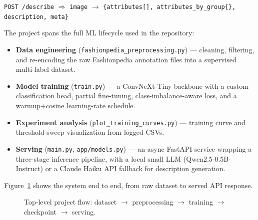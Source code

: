 \documentclass[11pt]{article}
\newcommand{\code}[1]{\texttt{\small #1}}
\begin{document}
\begin{center}
\texttt{POST /describe} \quad $\Longrightarrow$ \quad \texttt{image} $\to$ \texttt{\{attributes[], attributes\_by\_group\{\}, description, meta\}}
\end{center}

The project spans the full ML lifecycle used in the repository:

\begin{itemize}
\item \textbf{Data engineering} (\code{fashionpedia\_preprocessing.py}) --- cleaning, filtering, and re-encoding the raw Fashionpedia annotation files into a supervised multi-label dataset.
\item \textbf{Model training} (\code{train.py}) --- a ConvNeXt-Tiny backbone with a custom classification head, partial fine-tuning, class-imbalance-aware loss, and a warmup+cosine learning-rate schedule.
\item \textbf{Experiment analysis} (\code{plot\_training\_curves.py}) --- training curve and threshold-sweep visualization from logged CSVs.
\item \textbf{Serving} (\code{main.py}, \code{app/models.py}) --- an async FastAPI service wrapping a three-stage inference pipeline, with a local small LLM (Qwen2.5-0.5B-Instruct) or a Claude Haiku API fallback for description generation.
\end{itemize}

Figure~\ref{fig:system-overview} shows the system end to end, from raw dataset to served API response.

\begin{figure}[h]
\centering
{}
\caption{Top-level project flow: dataset $\to$ preprocessing $\to$ training $\to$ checkpoint $\to$ serving.}
\label{fig:system-overview}
\end{figure}
\end{document}
